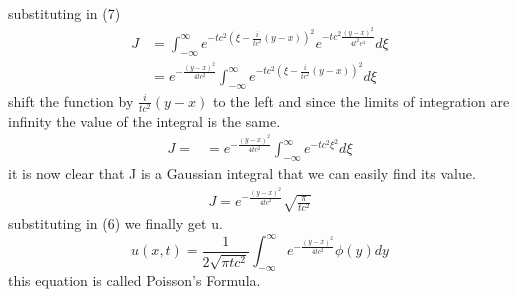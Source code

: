 \documentclass[]{article}
\begin{document}
substituting in (7)
\begin{align*}
J   &= \int_{-\infty}^{\infty}e^{-tc^2{(\xi-\frac{i}{tc^2}(y-x))}^2}e^{-tc^2\frac{{(y-x)}^2}{4t^2 c^4}} d\xi
\\
    &=e^{-\frac{{(y-x)}^2}{4tc^2}} \int_{-\infty}^{\infty}e^{-tc^2{(\xi-\frac{i}{tc^2}(y-x))}^2} d\xi
\end{align*}
shift the function by $\frac{i}{tc^2}(y-x)$ to the left and since the limits of integration are infinity the value of the integral is the same.
\begin{align*}
J = &=e^{-\frac{{(y-x)}^2}{4tc^2}} \int_{-\infty}^{\infty}e^{-tc^2\xi^2} d\xi
\end{align*}
it is now clear that J is a Gaussian integral that we can easily find its value.
\begin{align*}
J = e^{-\frac{{(y-x)}^2}{4tc^2}}\sqrt{\frac{\pi}{tc^2}}
\end{align*}
substituting in (6) we finally get u.
\[
    u(x,t) = \frac{1}{2\sqrt{\pi tc^2}}\int_{-\infty}^{\infty}e^{-\frac{{(y-x)}^2}{4tc^2}} \phi(y)dy    
\]
this equation is called Poisson's Formula.

\newpage
\setcounter{equation}{0}
\end{document}
